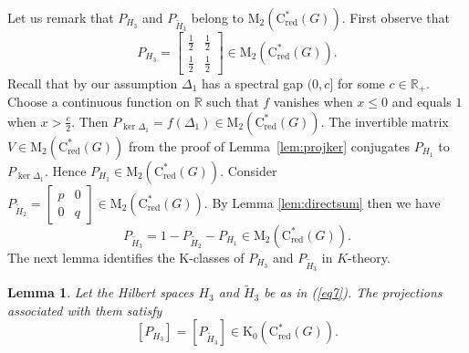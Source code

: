 \documentclass[a4paper,leqno,12pt]{article}
\numberwithin{equation}{section}
\theoremstyle{plain}
\newtheorem{lemma}[theoremcounter]{Lemma}
\theoremstyle{definition}
\theoremstyle{remark}
\newcommand{\Csr}{\mathrm{C}^*_{\text{red}}}
\begin{document}
Let us remark that $P_{H_3}$ and $P_{\tilde H_3}$ belong to $\mathrm M_2(\Csr(G))$. 
First observe that \[P_{ H_3}=\begin{bmatrix}\frac12 & \frac12 \\ \frac12 & \frac12 \end{bmatrix}\in \mathrm M_2(\Csr(G)).\]
Recall that by our assumption $\Delta_1$ has a spectral gap $(0, c]$ for some $c\in \mathbb R_{+}$.
Choose a continuous function on $\mathbb R$ such that $f$ vanishes when $x\le0$ and equals $1$ when $x>\frac{c}{2}$.
Then $P_{\ker\Delta_1}=f(\Delta_1)\in \mathrm M_2(\Csr(G))$. 
The invertible matrix $V\in \mathrm M_2(\Csr(G))$ 
from the proof of Lemma~\ref{lem:projker} conjugates  $P_{H_1}$ to $P_{\ker\Delta_1}$. 
Hence $P_{H_1}\in \mathrm M_2(\Csr(G))$. Consider $P_{\tilde H_2}=\begin{bmatrix}p & 0 \\0 & q\end{bmatrix}\in \mathrm M_2(\Csr(G))$. 
By Lemma \ref{lem:directsum} then
we have 
\[P_{\tilde H_3}=1-P_{\tilde H_2}-P_{H_1} \in \mathrm M_2(\Csr(G)).
\]
The next lemma identifies the K-classes of $P_{H_3}$ and $P_{\tilde H_3}$ in $K$-theory.	
	\begin{lemma}
		\label{lem:H3}
		Let the Hilbert spaces $H_3$ and $\tilde{H}_3$ be as in (\ref{eq7}). The projections associated with them satisfy $$[P_{H_3}]=[P_{\tilde H_3}]\in \mathrm K_0(\Csr(G)).$$
	\end{lemma}
\end{document}
